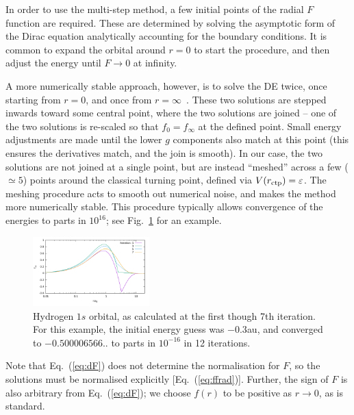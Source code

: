 \documentclass[10pt,twocolumn,a4paper]{article}%
\def\en{\ensuremath{\varepsilon}}
\begin{document}
In order to use the multi-step method, a few initial points of the radial $F$ function are required.
These are determined by solving the asymptotic form of the Dirac equation analytically accounting for the boundary conditions.
It is common to expand the orbital around $r=0$ to start the procedure, and then adjust the energy until $F\to0$ at infinity.

A more numerically stable approach, however, is to solve the DE twice, once starting from $r=0$, and once from $r=\infty$~\cite{JohnsonBook2007}.
These two solutions are stepped inwards toward some central point, where the two solutions are joined -- one of the two solutions is re-scaled so that $f_0=f_\infty$ at the defined point.
Small energy adjustments are made until the lower $g$ components also match at this point (this ensures the derivatives match, and the join is smooth).
In our case, the two solutions are not joined at a single point, but are instead ``meshed'' across a few ($\simeq5$)  points around the classical turning point, defined via $V(r_{\rm ctp}) = \en$.
The meshing procedure acts to smooth out numerical noise, and makes the method more numerically stable.
This procedure typically allows convergence of the energies to parts in $10^{16}$;
see Fig.~\ref{fig:H-SolveBS} for an example.


\begin{figure}
\centering
\includegraphics[width=0.4\textwidth]{img/H-SolveBS}
\caption{\small Hydrogen $1s$ orbital, as calculated at the first though 7th iteration. 
For this example, the initial energy guess was $-0.3$au, and converged to $-0.500006566..$ to parts in $10^{-16}$ in 12 iterations.\label{fig:H-SolveBS}}
\end{figure}





Note that Eq.~(\ref{eq:dF}) does not determine the normalisation for $F$, so the solutions must be normalised explicitly [Eq.~(\ref{eq:ffrad})].
Further, the sign of $F$ is also arbitrary from Eq.~(\ref{eq:dF}); we choose $f(r)$ to be positive as $r\to 0$, as is standard.
\end{document}
